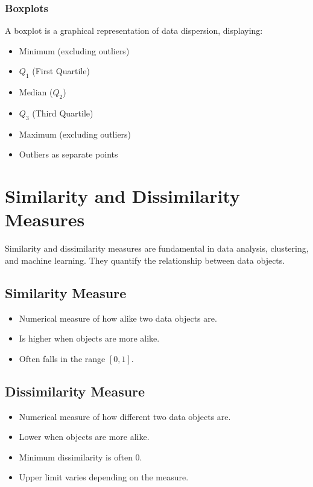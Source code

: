\documentclass[a4paper,12pt]{article}
\begin{document}
\subsubsection{Boxplots}
A boxplot is a graphical representation of data dispersion, displaying:
\begin{itemize}
    \item Minimum (excluding outliers)
    \item \( Q_1 \) (First Quartile)
    \item Median (\( Q_2 \))
    \item \( Q_3 \) (Third Quartile)
    \item Maximum (excluding outliers)
    \item Outliers as separate points
\end{itemize}

\section{Similarity and Dissimilarity Measures}

Similarity and dissimilarity measures are fundamental in data analysis, clustering, and machine learning. They quantify the relationship between data objects.

\subsection{Similarity Measure}
\begin{itemize}
    \item Numerical measure of how alike two data objects are.
    \item Is higher when objects are more alike.
    \item Often falls in the range \([0,1]\).
\end{itemize}

\subsection{Dissimilarity Measure}
\begin{itemize}
    \item Numerical measure of how different two data objects are.
    \item Lower when objects are more alike.
    \item Minimum dissimilarity is often 0.
    \item Upper limit varies depending on the measure.
\end{itemize}
\end{document}
